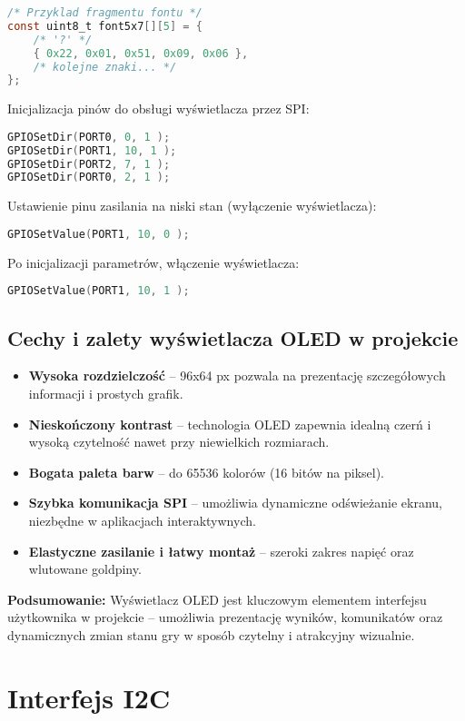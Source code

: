 \documentclass[a4paper,12pt]{report}
\begin{document}
\begin{lstlisting}[language=C]
/* Przyklad fragmentu fontu */
const uint8_t font5x7[][5] = {
    /* '?' */
    { 0x22, 0x01, 0x51, 0x09, 0x06 },
    /* kolejne znaki... */
};
\end{lstlisting}

Inicjalizacja pinów do obsługi wyświetlacza przez SPI:
\begin{lstlisting}[language=C]
GPIOSetDir(PORT0, 0, 1 );
GPIOSetDir(PORT1, 10, 1 );
GPIOSetDir(PORT2, 7, 1 );
GPIOSetDir(PORT0, 2, 1 );
\end{lstlisting}

Ustawienie pinu zasilania na niski stan (wyłączenie wyświetlacza):
\begin{lstlisting}[language=C]
GPIOSetValue(PORT1, 10, 0 );
\end{lstlisting}
Po inicjalizacji parametrów, włączenie wyświetlacza:
\begin{lstlisting}[language=C]
GPIOSetValue(PORT1, 10, 1 );
\end{lstlisting}

\subsection*{Cechy i zalety wyświetlacza OLED w projekcie}

\begin{itemize}
    \item \textbf{Wysoka rozdzielczość} – 96x64 px pozwala na prezentację szczegółowych informacji i prostych grafik.
    \item \textbf{Nieskończony kontrast} – technologia OLED zapewnia idealną czerń i wysoką czytelność nawet przy niewielkich rozmiarach.
    \item \textbf{Bogata paleta barw} – do 65536 kolorów (16 bitów na piksel).
    \item \textbf{Szybka komunikacja SPI} – umożliwia dynamiczne odświeżanie ekranu, niezbędne w aplikacjach interaktywnych.
    \item \textbf{Elastyczne zasilanie i łatwy montaż} – szeroki zakres napięć oraz wlutowane goldpiny.
\end{itemize}

\textbf{Podsumowanie:} Wyświetlacz OLED jest kluczowym elementem interfejsu użytkownika w projekcie – umożliwia prezentację wyników, komunikatów oraz dynamicznych zmian stanu gry w sposób czytelny i atrakcyjny wizualnie.

\section{Interfejs I2C}
\end{document}
